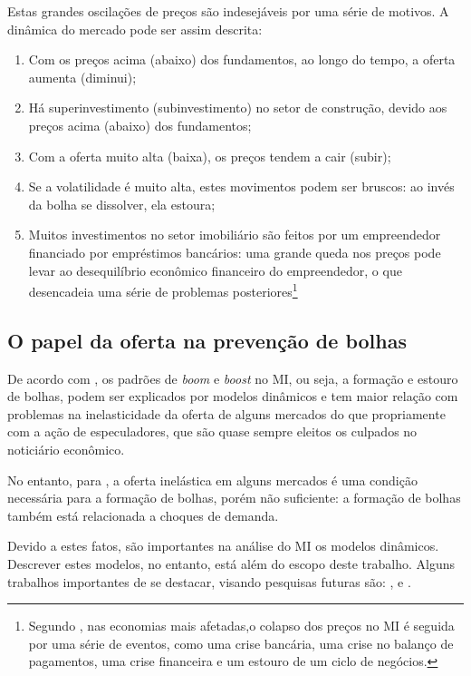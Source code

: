 \documentclass[
	12pt,				%
	oneside,			%
	a4paper,			%
	chapter=TITLE,		%
	section=TITLE,		%
	english,			%
	brazil				%
	]{abntex2}
\begin{document}
\begin{refsection}
Estas grandes oscilações de preços são indesejáveis por uma série de motivos.
A dinâmica do mercado pode ser assim descrita:
\begin{enumerate}
\def\labelenumi{\arabic{enumi}.}
\tightlist
\item
  Com os preços acima (abaixo) dos fundamentos, ao longo do tempo, a oferta
  aumenta (diminui);
\item
  Há superinvestimento (subinvestimento) no setor de construção, devido aos
  preços acima (abaixo) dos fundamentos;
\item
  Com a oferta muito alta (baixa), os preços tendem a cair (subir);
\item
  Se a volatilidade é muito alta, estes movimentos podem ser bruscos: ao invés
  da bolha se dissolver, ela estoura;
\item
  Muitos investimentos no setor imobiliário são feitos por um empreendedor
  financiado por empréstimos bancários: uma grande queda nos preços pode levar
  ao desequilíbrio econômico financeiro do empreendedor, o que desencadeia uma
  série de problemas posteriores\footnote{Segundo \textcite[p.~2]{Malpezzi2002TheRO}, nas economias mais afetadas,o colapso
    dos preços no \gls{MI} é seguida por uma série de eventos, como uma crise
    bancária, uma crise no balanço de pagamentos, uma crise financeira e um estouro
    de um ciclo de negócios.}
\end{enumerate}
\hypertarget{o-papel-da-oferta-na-prevenuxe7uxe3o-de-bolhas}{%
\subsection{O papel da oferta na prevenção de bolhas}\label{o-papel-da-oferta-na-prevenuxe7uxe3o-de-bolhas}}

De acordo com \textcite[p.~11]{regulation}, os padrões de \emph{boom} e \emph{boost} no \gls{MI},
ou seja, a formação e estouro de bolhas, podem ser explicados por modelos
dinâmicos e tem maior relação com problemas na inelasticidade da oferta de
alguns mercados do que propriamente com a ação de especuladores, que são quase
sempre eleitos os culpados no noticiário econômico.

No entanto, para \textcite[p.~1]{regulation}, a oferta inelástica em alguns mercados é
uma condição necessária para a formação de bolhas, porém não suficiente: a
formação de bolhas também está relacionada a choques de demanda.

Devido a estes fatos, são importantes na análise do \gls{MI} os modelos
dinâmicos. Descrever estes modelos, no entanto, está além do escopo deste
trabalho. Alguns trabalhos importantes de se destacar, visando pesquisas
futuras são: \textcite{wheaton1999}, \textcite{FAN201937} e \textcite{Malpezzi2002TheRO}.


\end{refsection}
\end{document}
